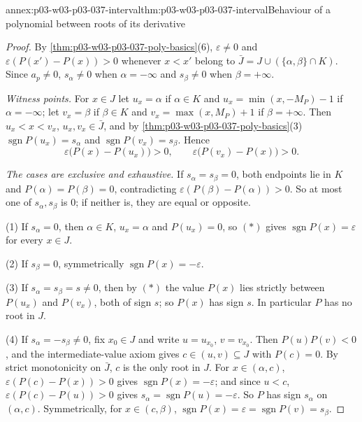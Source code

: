 \begin{annexitem}{annex:p03-w03-p03-037-interval}{thm:p03-w03-p03-037-interval}{Behaviour of a polynomial between roots of its derivative}
\begin{proof}
By \cref{thm:p03-w03-p03-037-poly-basics}(6), \(\varepsilon\neq0\) and
\(\varepsilon(P(x')-P(x))>0\) whenever \(x<x'\) belong to
\(\bar J=J\cup(\{\alpha,\beta\}\cap K)\).  Since \(a_p\neq0\),
\(s_\alpha\neq0\) when \(\alpha=-\infty\) and \(s_\beta\neq0\) when
\(\beta=+\infty\).

\emph{Witness points.}  For \(x\in J\) let \(u_x=\alpha\) if
\(\alpha\in K\) and \(u_x=\min(x,-M_P)-1\) if \(\alpha=-\infty\); let
\(v_x=\beta\) if \(\beta\in K\) and \(v_x=\max(x,M_P)+1\) if
\(\beta=+\infty\).  Then \(u_x<x<v_x\), \(u_x,v_x\in\bar J\), and by
\cref{thm:p03-w03-p03-037-poly-basics}(3)
\(\operatorname{sgn}P(u_x)=s_\alpha\) and \(\operatorname{sgn}P(v_x)=s_\beta\).
Hence
\[
\varepsilon\bigl(P(x)-P(u_x)\bigr)>0,\qquad
\varepsilon\bigl(P(v_x)-P(x)\bigr)>0.\tag{\(*\)}
\]

\emph{The cases are exclusive and exhaustive.}  If \(s_\alpha=s_\beta=0\),
both endpoints lie in \(K\) and \(P(\alpha)=P(\beta)=0\), contradicting
\(\varepsilon(P(\beta)-P(\alpha))>0\).  So at most one of
\(s_\alpha,s_\beta\) is \(0\); if neither is, they are equal or opposite.

(1) If \(s_\alpha=0\), then \(\alpha\in K\), \(u_x=\alpha\) and
\(P(u_x)=0\), so \((*)\) gives \(\operatorname{sgn}P(x)=\varepsilon\) for
every \(x\in J\).

(2) If \(s_\beta=0\), symmetrically \(\operatorname{sgn}P(x)=-\varepsilon\).

(3) If \(s_\alpha=s_\beta=s\neq0\), then by \((*)\) the value \(P(x)\) lies
strictly between \(P(u_x)\) and \(P(v_x)\), both of sign \(s\); so
\(P(x)\) has sign \(s\).  In particular \(P\) has no root in \(J\).

(4) If \(s_\alpha=-s_\beta\neq0\), fix \(x_0\in J\) and write \(u=u_{x_0}\),
\(v=v_{x_0}\).  Then \(P(u)P(v)<0\), and the intermediate-value axiom gives
\(c\in(u,v)\subseteq J\) with \(P(c)=0\).  By strict monotonicity on
\(\bar J\), \(c\) is the only root in \(J\).  For \(x\in(\alpha,c)\),
\(\varepsilon(P(c)-P(x))>0\) gives \(\operatorname{sgn}P(x)=-\varepsilon\);
and since \(u<c\), \(\varepsilon(P(c)-P(u))>0\) gives
\(s_\alpha=\operatorname{sgn}P(u)=-\varepsilon\).  So \(P\) has sign
\(s_\alpha\) on \((\alpha,c)\).  Symmetrically, for \(x\in(c,\beta)\),
\(\operatorname{sgn}P(x)=\varepsilon=\operatorname{sgn}P(v)=s_\beta\).
\end{proof}
\end{annexitem}


